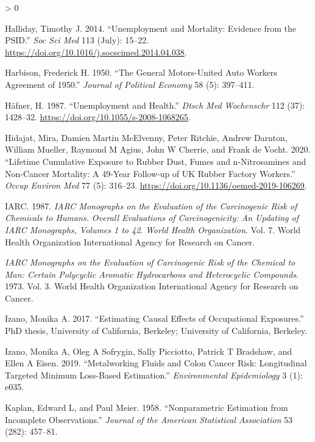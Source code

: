 \documentclass[
  11pt,
]{article}
\newlength{\cslhangindent}
\newenvironment{CSLReferences}[2] %
 {%
  \setlength{\parindent}{0pt}
  \ifodd #1 \everypar{\setlength{\hangindent}{\cslhangindent}}\ignorespaces\fi
  \ifnum #2 > 0
  \setlength{\parskip}{#2\baselineskip}
  \fi
 }%
 {}
\begin{document}
\begin{CSLReferences}{1}{0}
\leavevmode\hypertarget{ref-Halliday_2014}{}%
Halliday, Timothy J. 2014. {``Unemployment and Mortality: Evidence from
the PSID.''} \emph{Soc Sci Med} 113 (July): 15--22.
\url{https://doi.org/10.1016/j.socscimed.2014.04.038}.

\leavevmode\hypertarget{ref-Harbison_1950}{}%
Harbison, Frederick H. 1950. {``The General Motors-United Auto Workers
Agreement of 1950.''} \emph{Journal of Political Economy} 58 (5):
397--411.

\leavevmode\hypertarget{ref-Hafner_1987}{}%
Häfner, H. 1987. {``Unemployment and Health.''} \emph{Dtsch Med
Wochenschr} 112 (37): 1428--32.
\url{https://doi.org/10.1055/s-2008-1068265}.

\leavevmode\hypertarget{ref-Hidajat_2020}{}%
Hidajat, Mira, Damien Martin McElvenny, Peter Ritchie, Andrew Darnton,
William Mueller, Raymond M Agius, John W Cherrie, and Frank de Vocht.
2020. {``Lifetime Cumulative Exposure to Rubber Dust, Fumes and
n-Nitrosamines and Non-Cancer Mortality: A 49-Year Follow-up of UK
Rubber Factory Workers.''} \emph{Occup Environ Med} 77 (5): 316--23.
\url{https://doi.org/10.1136/oemed-2019-106269}.

\leavevmode\hypertarget{ref-IARC_1987}{}%
IARC. 1987. \emph{IARC Monographs on the Evaluation of the Carcinogenic
Risk of Chemicals to Humans. Overall Evaluations of Carcinogenicity: An
Updating of IARC Monographs, Volumes 1 to 42}. \emph{World Health
Organization}. Vol. 7. World Health Organization International Agency
for Research on Cancer.

\leavevmode\hypertarget{ref-IARC_1973}{}%
\emph{IARC Monographs on the Evaluation of Carcinogenic Risk of the
Chemical to Man: Certain Polycyclic Aromatic Hydrocarbons and
Heterocyclic Compounds}. 1973. Vol. 3. World Health Organization
International Agency for Research on Cancer.

\leavevmode\hypertarget{ref-Izano_2017_thesis}{}%
Izano, Monika A. 2017. {``Estimating Causal Effects of Occupational
Exposures.''} PhD thesis, University of California, Berkeley; University
of California, Berkeley.

\leavevmode\hypertarget{ref-Izano_2019}{}%
Izano, Monika A, Oleg A Sofrygin, Sally Picciotto, Patrick T Bradshaw,
and Ellen A Eisen. 2019. {``Metalworking Fluids and Colon Cancer Risk:
Longitudinal Targeted Minimum Loss-Based Estimation.''}
\emph{Environmental Epidemiology} 3 (1): e035.

\leavevmode\hypertarget{ref-Kaplan_1958}{}%
Kaplan, Edward L, and Paul Meier. 1958. {``Nonparametric Estimation from
Incomplete Observations.''} \emph{Journal of the American Statistical
Association} 53 (282): 457--81.


\end{CSLReferences}
\end{document}
